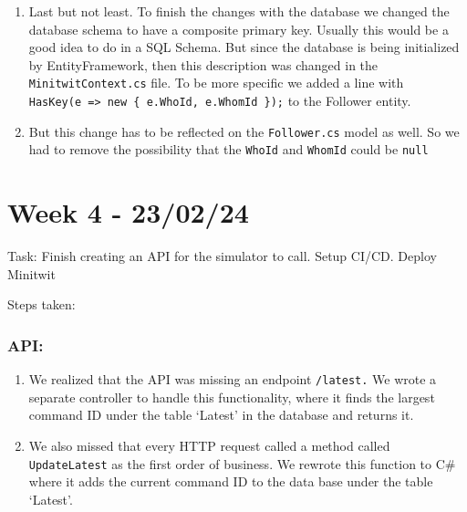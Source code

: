 \begin{enumerate}
    \item Last but not least. To finish the changes with the database we changed the database schema to have a composite primary key. Usually this would be a good idea to do in a SQL Schema. But since the database is being initialized by EntityFramework, then this description was changed in the \texttt{MinitwitContext.cs} file. To be more specific we added a line with \texttt{HasKey(e\ =\textgreater{}\ new\ \{\ e.WhoId,\ e.WhomId\ \});} to the Follower entity.
    \item But this change has to be reflected on the \texttt{Follower.cs} model as well. So we had to remove the possibility that the \texttt{WhoId} and \texttt{WhomId} could be \texttt{null}
\end{enumerate}

\section{Week 4 - 23/02/24}
\label{log:week4}

Task: Finish creating an API for the simulator to call. Setup CI/CD.
Deploy Minitwit

Steps taken:

\subsubsection{API:}
\label{log:api}

\begin{enumerate}
    \item We realized that the API was missing an endpoint \texttt{/latest.} We wrote a separate controller to handle this functionality, where it finds the largest command ID under the table `Latest' in the database and returns it.
    \item We also missed that every HTTP request called a method called \texttt{UpdateLatest} as the first order of business. We rewrote this function to C\# where it adds the current command ID to the data base under the table `Latest'.
\end{enumerate}

